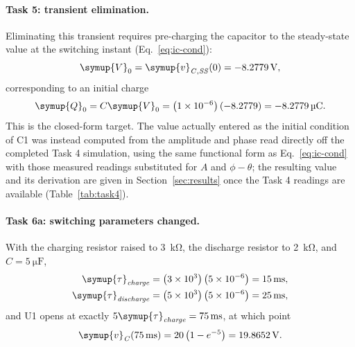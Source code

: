 \documentclass[12pt,a4paper]{article}
\begin{document}
	\paragraph{Task 5: transient elimination.}
	Eliminating this transient requires pre-charging the capacitor to
	the steady-state value at the switching instant
	(Eq.~\eqref{eq:ic-cond}):
	\begin{equation}
		\symup{V}_{0} = \symup{v}_{\mathit{C,SS}}(0) = \SI{-8.2779}{\volt},
	\end{equation}
	corresponding to an initial charge
	\begin{equation}
		\symup{Q}_{0} = C \symup{V}_{0} = \left(1\times10^{-6}\right)(-8.2779)
		= \SI{-8.2779}{\micro\coulomb}.
	\end{equation}
	This is the closed-form target.  The value actually entered as the
	initial condition of C1 was instead computed from the amplitude
	and phase read directly off the completed Task 4 simulation, using
	the same functional form as Eq.~\eqref{eq:ic-cond} with those
	measured readings substituted for $A$ and $\phi-\theta$; the
	resulting value and its derivation are given in
	Section~\ref{sec:results} once the Task 4 readings are available
	(Table~\ref{tab:task4}).
	
	\paragraph{Task 6a: switching parameters changed.}
	With the charging resistor raised to \SI{3}{\kilo\ohm}, the
	discharge resistor to \SI{2}{\kilo\ohm}, and
	$C = \SI{5}{\micro\farad}$,
	\begin{align}
		\symup{\tau}_{\mathit{charge}} &= \left(3\times 10^{3}\right)\left(5\times 10^{-6}\right)
		= \SI{15}{\milli\second}, \\
		\symup{\tau}_{\mathit{discharge}} &= \left(5\times 10^{3}\right)\left(5\times 10^{-6}\right)
		= \SI{25}{\milli\second},
	\end{align}
	and U1 opens at exactly $5\symup{\tau}_{\mathit{charge}} =
	\SI{75}{\milli\second}$, at which point
	\begin{equation}
		\symup{v}_{\mathit{C}}(\SI{75}{\milli\second}) = 20\left(1 - e^{-5}\right)
		= \SI{19.8652}{\volt}.
	\end{equation}
	
\end{document}
